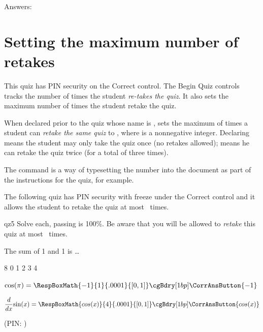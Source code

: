 \documentclass[10pt]{article}
\let\uif\textsf
\begin{document}
\noindent
Answers: \AnswerField\currQuiz

\section{Setting the maximum number of retakes}

This quiz has PIN security on the \uif{Correct} control. The \uif{Begin Quiz} controls
tracks the number of times the student \emph{re-takes the quiz}. It also sets the maximum
number of times the student retake the quiz.
\bVerb{}%
\def\1{\rlap{\sffamily\hskip\linewidth(use with \cs{usePINCorrBtn})}}
\begin{dCmd}[commandchars=!()]{\bxSize}
\end{dCmd}
\eVerb When declared prior to the quiz whose name is ,
 sets the maximum of times a student can \emph{retake the same
quiz} to , where  is a nonnegative integer. Declaring
 means the student may only
take the quiz once (no retakes allowed);  means he
can retake the quiz twice (for a total of three times).

The command  is a way of typesetting
the number  into the document as part of the instructions for the
quiz, for example.

\showScoreOn
\useBeginQuizCnt
{}

\newtopic\noindent The following quiz has PIN security with freeze under the \uif{Correct} control and it
allows the student to retake the quiz at most ~times.

\begin{quiz*}{qz5}
Solve each, passing is 100\%. Be aware that you will be allowed to
\emph{retake} this quiz at most ~times.
\begin{questions}
    \item The sum of 1 and 1 is \dots
\begin{answers}{8}
\bChoices
   0\eAns
   1\eAns
   2\eAns
   3\eAns
   4\eAns
\eChoices
\end{answers}
  \item $ \cos(\pi) = \RespBoxMath{-1}{1}{.0001}{[0,1]}\cgBdry[1bp]
\CorrAnsButton{-1} $

\item $\displaystyle\frac{d}{dx}{\sin(x)}=\RespBoxMath{cos(x)}{4}{.0001}{[0,1]}\cgBdry[1bp]
\CorrAnsButton{cos(x)} $
\end{questions}
\end{quiz*}\quad\ScoreField[\rectW{2.25in}]\currQuiz\olBdry\CorrButton[\cmd{\FreezeThisQuiz}]{\currQuiz} (PIN: \numPINId)\hfill\qzResetTally
\end{document}

